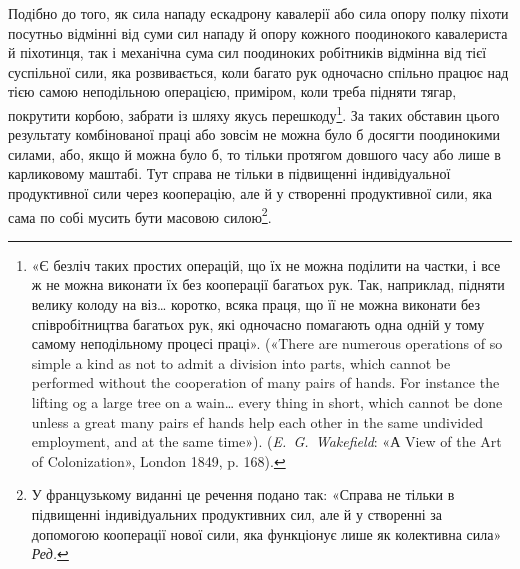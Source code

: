 Подібно до того, як сила нападу ескадрону кавалерії або сила
опору полку піхоти посутньо відмінні від суми сил нападу й
опору кожного поодинокого кавалериста й піхотинця, так і механічна
сума сил поодиноких робітників відмінна від тієї суспільної
сили, яка розвивається, коли багато рук одночасно спільно працює
над тією самою неподільною операцією, приміром, коли треба
підняти тягар, покрутити корбою, забрати із шляху якусь перешкоду\footnote{
«Є безліч таких простих операцій, що їх не можна поділити на
частки, і все ж не можна виконати їх без кооперації багатьох рук. Так,
наприклад, підняти велику колоду на віз\dots{} коротко, всяка праця, що
її не можна виконати без співробітництва багатьох рук, які одночасно
помагають одна одній у тому самому неподільному процесі праці». («There
are numerous operations of so simple a kind as not to admit a division into
parts, which cannot be performed without the cooperation of many pairs
of hands. For instance the lifting og a large tree on a wain\dots{} every thing
in short, which cannot be done unless a great many pairs ef hands help each
other in the same undivided employment, and at the same time»). (\emph{E.~G.~Wakefield}: «А View of the Art of Colonization», London 1849, p. 168).
}.
За таких обставин цього результату комбінованої
праці або зовсім не можна було б досягти поодинокими силами,
або, якщо й можна було б, то тільки протягом довшого часу або
лише в карликовому маштабі. Тут справа не тільки в підвищенні
індивідуальної продуктивної сили через кооперацію, але й у
створенні продуктивної сили, яка сама по собі мусить бути масовою
силою\footnote*{У французькому виданні це речення подано так: «Справа не тільки
в підвищенні індивідуальних продуктивних сил, але й у створенні за допомогою
кооперації нової сили, яка функціонує лише як колективна
сила» \emph{Ред.}}.


